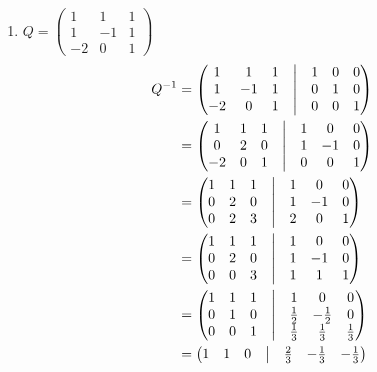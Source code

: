 \documentclass[13pt]{article}
\begin{document}
\begin{enumerate}[label=(\alph*),leftmargin=*]
\item $Q =
  \begin{pmatrix}
    1 & 1 & 1 \\
    1 & -1 & 1 \\
    -2 & 0 & 1
  \end{pmatrix}
  $
  \begin{align*}
    Q^{-1} &=
             \begin{pmatrix}
               1 & 1 & 1 & \bigm| & 1 & 0 & 0 \\
               1 & -1 & 1 & \bigm| & 0 & 1 & 0 \\
               -2 & 0 & 1 & \bigm| & 0 & 0 & 1
             \end{pmatrix} \\
           &=
             \begin{pmatrix}
               1 & 1 & 1 & \bigm| & 1 & 0 & 0 \\
               0 & 2 & 0 & \bigm| & 1 & -1 & 0 \\
               -2 & 0 & 1 & \bigm| & 0 & 0 & 1
             \end{pmatrix} \\
           &=
             \begin{pmatrix}
               1 & 1 & 1 & \bigm| & 1 & 0 & 0 \\
               0 & 2 & 0 & \bigm| & 1 & -1 & 0 \\
               0 & 2 & 3 & \bigm| & 2 & 0 & 1
             \end{pmatrix} \\
           &=
             \begin{pmatrix}
               1 & 1 & 1 & \bigm| & 1 & 0 & 0 \\
               0 & 2 & 0 & \bigm| & 1 & -1 & 0 \\
               0 & 0 & 3 & \bigm| & 1 & 1 & 1
             \end{pmatrix} \\
           &=
             \begin{pmatrix}
               1 & 1 & 1 & \bigm| & 1 & 0 & 0 \\
               0 & 1 & 0 & \bigm| & \frac{1}{2} & -\frac{1}{2} & 0 \\
               0 & 0 & 1 & \bigm| & \frac{1}{3} & \frac{1}{3} & \frac{1}{3}
             \end{pmatrix} \\
           &=
             \begin{pmatrix}
               1 & 1 & 0 & \bigm| & \frac{2}{3} & -\frac{1}{3} & -\frac{1}{3} \\

\end{pmatrix}
\end{align*}
\end{enumerate}
\end{document}
